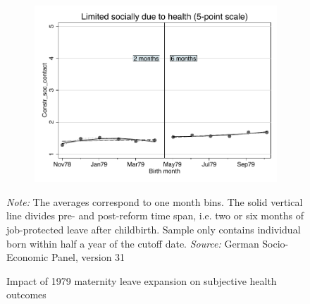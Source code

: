 \documentclass[a4paper ]{article}
\begin{document}
\begin{figure}[p]
\begin{subfigure}[h]{0.48\textwidth}\centering
	\includegraphics[width=\textwidth]{../../analysis/graphs/SOEP/Constr_soc_contact_RD.pdf}
\end{subfigure}


\caption{Impact of 1979 maternity leave expansion on subjective health outcomes}\label{fig: RD_SH}
\begin{minipage}{\textwidth} %
{\footnotesize \textit{Note:} The averages correspond to one month bins. The solid vertical line divides pre- and post-reform time span, i.e. two or six months of job-protected leave after childbirth. Sample only contains individual born within half a year of the cutoff date. \newline \textit{Source: }German Socio-Economic Panel, version 31\par}
\end{minipage}
\end{figure}
\end{document}
